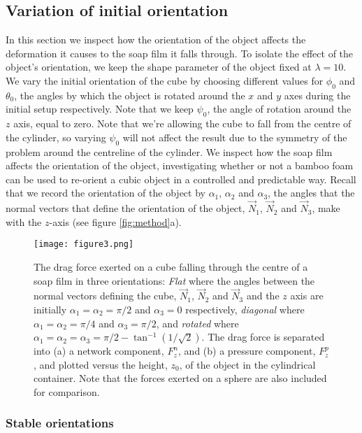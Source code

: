 \documentclass[preprint]{revtex4-1}
\begin{document}
\subsection{Variation of initial orientation}
	\label{sec:orientation}

In this section we inspect how the orientation of the object affects the deformation it causes to the soap film it falls through. To isolate the effect of the object's orientation, we keep the shape parameter of the object fixed at $\lambda=10$. We vary the initial orientation of the cube by choosing different values for $\phi_0$ and $\theta_0$, the angles by which the object is rotated around the $x$ and $y$ axes during the initial setup respectively. Note that we keep $\psi_0$, the angle of rotation around the $z$ axis, equal to zero. Note that we're allowing the cube to fall from the centre of the cylinder, so varying $\psi_0$ will not affect the result due to the symmetry of the problem around the centreline of the cylinder.  We inspect how the soap film affects the orientation of the object, investigating whether or not a bamboo foam can be used to re-orient a cubic object in a controlled and predictable way. Recall that we record the orientation of the object by $\alpha_1$, $\alpha_2$ and $\alpha_3$, the angles that the normal vectors that define the orientation of the object, $\vec{N}_1$, $\vec{N}_2$ and $\vec{N}_3$, make with the $z$-axis (see figure \ref{fig:method}a).



\begin{figure}
    \centering
			\texttt{[image: figure3.png]}
		\caption{The drag force exerted on a cube falling through the centre of a soap film in three orientations: \emph{Flat} where the angles between the normal vectors defining the cube, $\vec{N}_1$, $\vec{N}_2$ and $\vec{N}_3$ and the $z$ axis are initially $\alpha_1=\alpha_2=\pi/2$ and $\alpha_3=0$ respectively, \emph{diagonal} where $\alpha_1=\alpha_2=\pi/4$ and $\alpha_3=\pi/2$, and \emph{rotated} where $\alpha_1=\alpha_2=\alpha_3=\pi/2-\tan^{-1}\left(1/\sqrt{2}\right)$. The drag force is separated into (a) a network component, $F^n_z$, and (b) a pressure component, $F^p_z$, and plotted versus the height, $z_0$, of the object in the cylindrical container. Note that the forces exerted on a sphere are also included for comparison.}
	\label{fig:drag_stable}
	\end{figure}
	


	
\subsubsection{Stable orientations}
\end{document}
